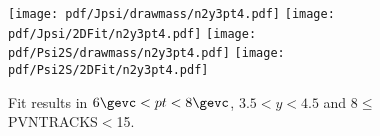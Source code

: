 \begin{figure}[H]
\begin{center}
\texttt{[image: pdf/Jpsi/drawmass/n2y3pt4.pdf]}
\texttt{[image: pdf/Jpsi/2DFit/n2y3pt4.pdf]}
\vspace*{-0.5cm}
\texttt{[image: pdf/Psi2S/drawmass/n2y3pt4.pdf]}
\texttt{[image: pdf/Psi2S/2DFit/n2y3pt4.pdf]}
\vspace*{-0.5cm}
\end{center}
\caption{Fit results in $6\gevc<pt<8\gevc$, $3.5<y<4.5$ and 8$\leq$PVNTRACKS$<$15.}
\label{Fitn2y3pt4}
\end{figure}
